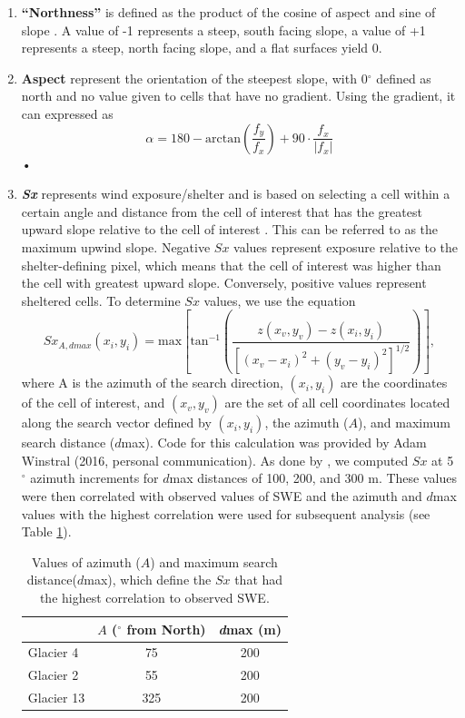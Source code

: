 \documentclass[12pt]{article}
\begin{document}
\begin{enumerate}
\item[] \textbf{``Northness''} is defined as the product of the cosine of aspect and sine of slope \citep{Molotch2005}. A value of -1 represents a steep, south facing slope, a value of +1 represents a steep, north facing slope, and a flat surfaces yield 0. 

\item[] \textbf{Aspect} represent the orientation of the steepest slope, with 0${^\circ}$ defined as north and no value given to cells that have no gradient. Using the gradient, it can expressed as \citep{Olaya2009}
	\begin{equation}
	\alpha = 180 - \textrm{arctan}\left(\frac{ f_y}{ f_x}\right)+90 \cdot \frac{ f_x}{| f_x|}
	\end{equation}•

\item[] \textbf{\textit{Sx}} represents wind exposure/shelter and is based on selecting a cell within a certain angle and distance from the cell of interest that has the greatest upward slope relative to the cell of interest \citep{Winstral2002}. This can be referred to as the maximum upwind slope. Negative $Sx$ values represent exposure relative to the shelter-defining pixel, which means that the cell of interest was higher than the cell with greatest upward slope. Conversely, positive values represent sheltered cells. To determine $Sx$ values, we use the equation
\begin{equation}
Sx_{A, dmax}(x_i, y_i) = \textrm{max} \left[ \textrm{tan}^{-1} \left( \frac{z(x_v,y_v)-z(x_i,y_i)}{[(x_v-x_i)^2+(y_v-y_i)^2]^{1/2}} \right) \right] ,
\end{equation}
where A is the azimuth of the search direction, $(x_i, y_i)$ are the coordinates of the cell of interest, and $(x_v, y_v)$ are the set of all cell coordinates located along the search vector defined by	$(x_i, y_i)$, the azimuth ($A$), and maximum search distance ($d$max). Code for this calculation was provided by Adam Winstral (2016, personal communication). As done by \cite{McGrath2015}, we computed $Sx$ at 5$^{\circ}$ azimuth increments for $d$max distances of 100, 200, and 300 m. These values were then correlated with observed values of SWE and the azimuth and $d$max values with the highest correlation were used for subsequent analysis (see Table \ref{tab:Sxparams}). 

\begin{table}[]
\centering
\caption{Values of azimuth ($A$) and maximum search distance($d$max), which define the $Sx$ that had the highest correlation to observed SWE.}
\label{tab:Sxparams}
\begin{tabular}{lcc}
           & \textbf{$A$ ($^{\circ}$ from North)} & \textbf{\textit{d}max (m)} \\ \hline
Glacier 4  & 75                                & 200                 \\
Glacier 2  & 55                                & 200                 \\
Glacier 13 & 325                            & 200                
\end{tabular}
\end{table}


\end{enumerate}
\end{document}
